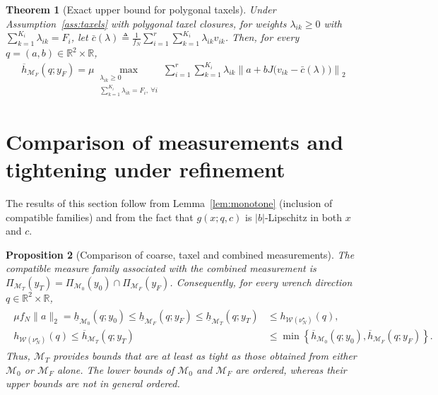 \documentclass[11pt,a4paper]{article}
\theoremstyle{plain}
\newtheorem{theorem}{Theorem}[section]
\newtheorem{proposition}[theorem]{Proposition}
\begin{document}
\begin{theorem}[Exact upper bound for polygonal taxels]
\label{thm:taxel_upper}
    Under Assumption~\ref{ass:taxels} with polygonal taxel closures, for weights $\lambda_{ik}\geq0$ with $\sum_{k=1}^{K_i}\lambda_{ik}=F_i$, let
    $\bar c(\lambda)\triangleq\frac{1}{f_N}\sum_{i=1}^r\sum_{k=1}^{K_i}\lambda_{ik}v_{ik}$. Then, for every $q=(a,b)\in\mathbb R^2\times\mathbb R$,
    \begin{align}
        \label{eq:taxel_upper_reduction}
        \boxed{\overline h_{\mathcal M_F}(q;y_F)
        =
        \mu
        \max_{\substack{
            \lambda_{ik}\geq0\\
            \sum_{k=1}^{K_i}\lambda_{ik}=F_i,\ \forall i
        }}
        \sum_{i=1}^r\sum_{k=1}^{K_i}
        \lambda_{ik}
        \left\|
        a+bJ\bigl(v_{ik}-\bar c(\lambda)\bigr)
        \right\|_2}
    \end{align}
\end{theorem}


\section{Comparison of measurements and tightening under refinement}
\label{sec:refinement}

The results of this section follow from Lemma~\ref{lem:monotone} (inclusion of compatible families) and from the fact that
$g(x;q,c)$ is $|b|$-Lipschitz in both $x$ and $c$.

\begin{proposition}[Comparison of coarse, taxel and combined measurements]
\label{prop:taxel_refinement}
The compatible measure family associated with the combined measurement is
$\Pi_{\mathcal M_T}(y_T)=\Pi_{\mathcal M_0}(y_0)\cap\Pi_{\mathcal M_F}(y_F)$.
Consequently, for every wrench direction $q\in\mathbb R^2\times\mathbb R$,
\begin{align}
\boxed{
\begin{aligned}
\mu f_N\|a\|_2
=
\underline h_{\mathcal M_0}(q;y_0)
\le
\underline h_{\mathcal M_F}(q;y_F)
\le
\underline h_{\mathcal M_T}(q;y_T)
&\le
h_{\mathcal W(\nu_N^\star)}(q),\\
h_{\mathcal W(\nu_N^\star)}(q)
\le
\overline h_{\mathcal M_T}(q;y_T)
&\le
\min\left\{
\overline h_{\mathcal M_0}(q;y_0),
\overline h_{\mathcal M_F}(q;y_F)
\right\}.
\end{aligned}
}
\end{align}
Thus, $\mathcal M_T$ provides bounds that are at least as tight as those
obtained from either $\mathcal M_0$ or $\mathcal M_F$ alone. The lower bounds of $\mathcal M_0$ and $\mathcal M_F$ are ordered,
whereas their upper bounds are not in general ordered.
\end{proposition}
\end{document}
